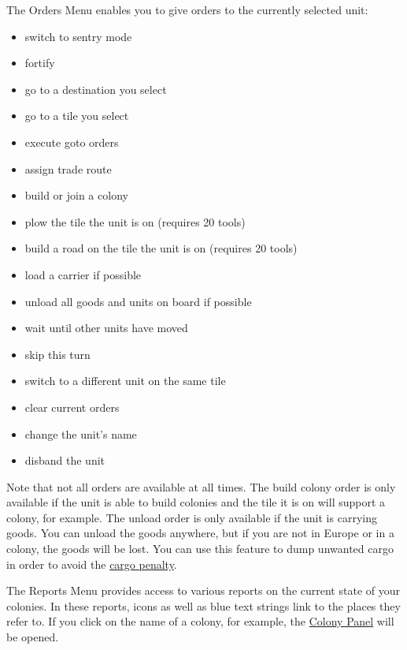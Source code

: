 \documentclass[12pt]{book}
\begin{document}
The \hypertarget{orders menu}{Orders Menu} enables you to give orders
to the currently selected unit:

\begin{itemize}
\item switch to sentry mode
\item fortify
\item go to a destination you select
\item go to a tile you select
\item execute goto orders
\item assign trade route
\item build or join a colony
\item plow the tile the unit is on (requires 20 tools)
\item build a road on the tile the unit is on (requires 20 tools)
\item load a carrier if possible
\item unload all goods and units on board if possible
\item wait until other units have moved
\item skip this turn
\item switch to a different unit on the same tile
\item clear current orders
\item change the unit's name
\item disband the unit
\end{itemize}

Note that not all orders are available at all times. The build colony
order is only available if the unit is able to build colonies and the
tile it is on will support a colony, for example. The unload order is
only available if the unit is carrying goods. You can unload the goods
anywhere, but if you are not in Europe or in a colony, the goods will
be lost.  You can use this feature to dump unwanted cargo in order to avoid the \hyperlink{Cargo Penalty}{cargo
  penalty}.

The \hypertarget{reports menu}{Reports Menu} provides access to
various reports on the current state of your colonies. In these
reports, icons as well as blue text strings link to the places they
refer to. If you click on the name of a colony, for example, the
\hyperlink{colony panel}{Colony Panel} will be opened.
\end{document}
